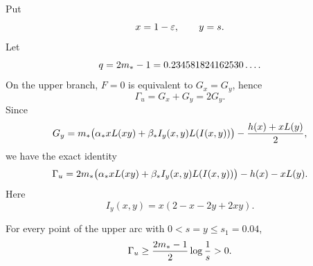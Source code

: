Put
\begin{equation}\label{eq:eps_s_coords}
  x=1-\varepsilon,
  \qquad
  y=s.
\end{equation}
Let
\begin{equation}\label{eq:q_def}
  q=2m_*-1=0.234581824162530\ldots .
\end{equation}
On the upper branch, \(F=0\) is equivalent to \(G_x=G_y\), hence
\begin{equation}\label{eq:Gamma_u_2Gy}
  \Gamma_u=G_x+G_y=2G_y.
\end{equation}
Since
\begin{equation}\label{eq:Gy_formula}
  G_y=m_*\bigl(\alpha_* xL(xy)+\beta_* I_y(x,y)L(I(x,y))\bigr)-\frac{h(x)+xL(y)}2,
\end{equation}
we have the exact identity
\begin{equation}\label{eq:Gamma_u_endpoint_exact}
  \Gamma_u=2m_*\bigl(\alpha_* xL(xy)+\beta_* I_y(x,y)L(I(x,y))\bigr)-h(x)-xL(y).
\end{equation}
Here
\begin{equation}\label{eq:I_y_endpoint}
  I_y(x,y)=x(2-x-2y+2xy).
\end{equation}

\begin{lemma}\label{lem:endpoint}
For every point of the upper arc with \(0<s=y\le s_1=0.04\),
\begin{equation}\label{eq:endpoint_positive}
  \Gamma_u\ge \frac{2m_*-1}{2}\log\frac1s>0.
\end{equation}
\end{lemma}

